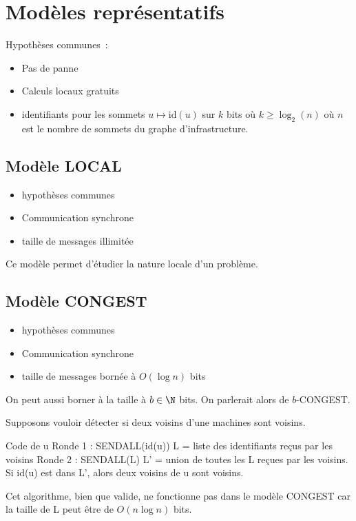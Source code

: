 \section{Modèles représentatifs}

Hypothèses communes~:
\begin{itemize}
  \item Pas de panne
  \item Calculs locaux gratuits
  \item identifiants pour les sommets $u \mapsto \text{id}(u)$ sur $k$ bits où $k \geq \log_2(n)$ où $n$ est le nombre de sommets du graphe d'infrastructure.
\end{itemize}

\subsection{Modèle LOCAL}
\begin{itemize}
  \item hypothèses communes
  \item Communication synchrone
  \item taille de messages illimitée
\end{itemize}
Ce modèle permet d'étudier la nature locale d'un problème.

\subsection{Modèle CONGEST}
\begin{itemize}
  \item hypothèses communes
  \item Communication synchrone
  \item taille de messages bornée à $O(\log n)$ bits 
\end{itemize}

On peut aussi borner à la taille à $b \in \N$ bits. On parlerait alors de $b$-CONGEST.


\begin{exemple}{}{}
  Supposons vouloir détecter si deux voisins d'une machines sont voisins.
  \begin{lstLNat}
    Code de u
    Ronde 1 : SENDALL(id(u))
              L = liste des identifiants reçus par les voisins
    Ronde 2 : SENDALL(L)
              L' = union de toutes les L reçues par les voisins.
              Si id(u) est dans L', alors deux voisins de u sont voisins.
  \end{lstLNat}
  Cet algorithme, bien que valide, ne fonctionne pas dans le modèle CONGEST car la taille de L peut être de $O(n \log n)$ bits.
\end{exemple}

